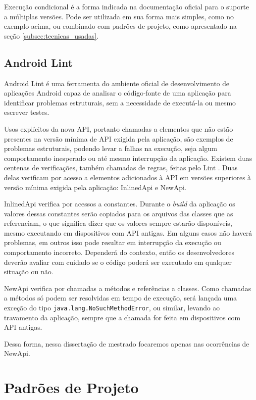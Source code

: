 Execução condicional é a forma indicada na documentação oficial
\cite{SupportDifferentVersions} para o suporte a múltiplas versões. Pode ser
utilizada em sua forma mais simples, como no exemplo acima, ou combinado com
padrões de projeto, como apresentado na seção \ref{subsec:tecnicas_usadas}.


\subsection{Android Lint}
\label{subsec:android-lint}

Android Lint \cite{Lint2016} é uma ferramenta do ambiente oficial de desenvolvimento
de aplicações Android capaz de analisar o código-fonte de uma aplicação para identificar
problemas estruturais, sem a necessidade de executá-la ou mesmo escrever testes.

Usos explícitos da nova API, portanto chamadas a elementos que não estão presentes
na versão mínima de API exigida pela aplicação, são exemplos de problemas estruturais,
podendo levar a falhas na execução, seja algum comportamento inesperado ou até
mesmo interrupção da aplicação. Existem duas centenas de verificações, também
chamadas de regras, feitas pelo Lint \cite{LintChecks}. Duas delas verificam por
acesso a elementos adicionados à API em versões superiores à versão mínima exigida
pela aplicação: InlinedApi e NewApi.

InlinedApi verifica por acessos a constantes. Durante o \textit{build} da aplicação os
valores dessas constantes serão copiados para os arquivos das classes que as
referenciam, o que significa dizer que os valores sempre estarão disponíveis,
mesmo executando em dispositivos com API antigas. Em alguns casos não haverá
problemas, em outros isso pode resultar em interrupção da execução ou comportamento
incorreto. Dependerá do contexto, então os desenvolvedores deverão avaliar com cuidado
se o código poderá ser executado em qualquer situação ou não.

NewApi verifica por chamadas a métodos e referências a classes. Como chamadas a
métodos só podem ser resolvidas em tempo de execução, será lançada uma exceção do
tipo \texttt{java.lang.NoSuchMethodError}, ou similar, levando ao travamento da
aplicação, sempre que a chamada for feita em dispositivos com API antigas.

Dessa forma, nessa dissertação de mestrado focaremos apenas nas ocorrências de NewApi.

\section{Padrões de Projeto}
\label{sec:padroes-de-projeto}

